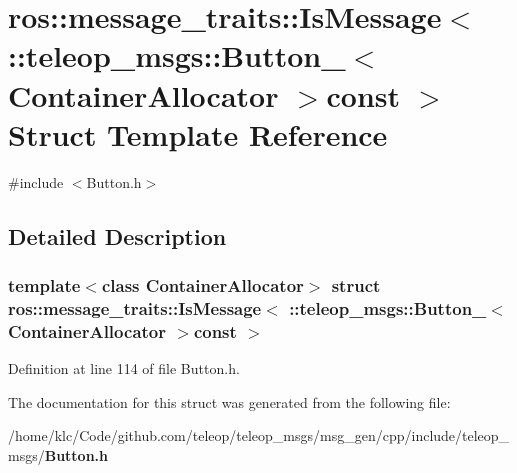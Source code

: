 \section{ros::message\_\-traits::IsMessage$<$ ::teleop\_\-msgs::Button\_\-$<$ ContainerAllocator $>$const $>$ Struct Template Reference}
\label{structros_1_1message__traits_1_1IsMessage_3_01_1_1teleop__msgs_1_1Button___3_01ContainerAllocator_01_4const_01_01_4}


{\ttfamily \#include $<$Button.h$>$}



\subsection{Detailed Description}
\subsubsection*{template$<$class ContainerAllocator$>$ struct ros::message\_\-traits::IsMessage$<$ ::teleop\_\-msgs::Button\_\-$<$ ContainerAllocator $>$const  $>$}



Definition at line 114 of file Button.h.



The documentation for this struct was generated from the following file:\begin{DoxyCompactItemize}
\item 
/home/klc/Code/github.com/teleop/teleop\_\-msgs/msg\_\-gen/cpp/include/teleop\_\-msgs/{\bf Button.h}\end{DoxyCompactItemize}
